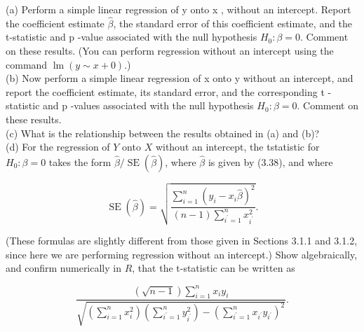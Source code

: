 \documentclass[10pt]{article}
\begin{document}
(a) Perform a simple linear regression of y onto x , without an intercept. Report the coefficient estimate $\hat{\beta}$, the standard error of this coefficient estimate, and the t-statistic and p -value associated with the null hypothesis $H_{0}: \beta=0$. Comment on these results. (You can perform regression without an intercept using the command $\operatorname{lm}(y \sim x+0)$.)\\
(b) Now perform a simple linear regression of x onto y without an intercept, and report the coefficient estimate, its standard error, and the corresponding t -statistic and p -values associated with the null hypothesis $H_{0}: \beta=0$. Comment on these results.\\
(c) What is the relationship between the results obtained in (a) and (b)?\\
(d) For the regression of $Y$ onto $X$ without an intercept, the tstatistic for $H_{0}: \beta=0$ takes the form $\hat{\beta} / \operatorname{SE}(\hat{\beta})$, where $\hat{\beta}$ is given by (3.38), and where

$$
\operatorname{SE}(\hat{\beta})=\sqrt{\frac{\sum_{i=1}^{n}\left(y_{i}-x_{i} \hat{\beta}\right)^{2}}{(n-1) \sum_{i^{\prime}=1}^{n} x_{i^{\prime}}^{2}}} .
$$

(These formulas are slightly different from those given in Sections 3.1.1 and 3.1.2, since here we are performing regression without an intercept.) Show algebraically, and confirm numerically in $R$, that the t-statistic can be written as

$$
\frac{(\sqrt{n-1}) \sum_{i=1}^{n} x_{i} y_{i}}{\sqrt{\left(\sum_{i=1}^{n} x_{i}^{2}\right)\left(\sum_{i^{\prime}=1}^{n} y_{i^{\prime}}^{2}\right)-\left(\sum_{i^{\prime}=1}^{n} x_{i^{\prime}} y_{i^{\prime}}\right)^{2}}} .
$$
\end{document}
